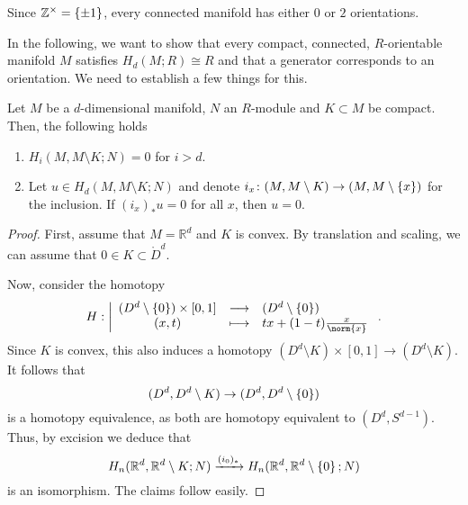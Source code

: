 \begin{example}
  Since $\mathbb{Z}^{\times} = \left\{  \pm 1  \right\} $,
  every connected manifold has either $0$ or  $2$ orientations.
\end{example}

In the following,
we want to show that every compact, connected,
$R$-orientable manifold $M$ satisfies
$H_d(M;R) \cong R$ and that a generator corresponds
to an orientation.
We need to establish a few things for this.

\begin{lemma}
  \label{lm:top-homology-of-manifold-relative-to-cocompact-subset}
  Let $M$ be a $d$-dimensional manifold, $N$ an  $R$-module
  and  $K\subset M$ be compact.
  Then, the following holds
  \begin{enumerate}[h]
    \item $H_i(M, M\setminus K ; N) = 0$ for $i>d$.
    \item Let $u\in H_d(M, M \setminus K;N)$ and denote
      $i_x\colon (M, M \setminus K) \to  (M, M \setminus \left\{  x  \right\} )$
      for the inclusion.
      If $(i_x)_* u = 0$ for all  $x$, then $u=0$.
  \end{enumerate}
\end{lemma}

\begin{proof}
  First, assume that $M = \mathbb{R}^d$ and $K$ is convex.
  By translation and scaling, we can assume that
  $0\in K\subset \mathring{D}^d$.

  Now, consider the homotopy
    \begin{equation*}
    H: \left| \begin{array}{c c l} 
      (D^d \setminus \set{ 0 } ) \times [0,1]
      & \longrightarrow &
      (D^d \setminus \set{ 0 } ) \\
      (x,t) & \longmapsto &  tx + (1-t) \frac{x}{\norm{x}}
    \end{array} \right.
    .
  \end{equation*}
  Since $K$ is convex, this also induces a homotopy
  $(D^d \setminus K) \times [0,1] \to  (D^d \setminus K)$.
  It follows that
  \[
    (D^d, D^d \setminus K) \to (D^d, D^d \setminus \left\{  0  \right\} )
  \]
  is a homotopy equivalence,
  as both are homotopy equivalent to $(D^d, S^{d-1})$.
  Thus, by excision we deduce that
  \[
    H_n(\mathbb{R}^d, \mathbb{R}^d \setminus K;N)
    \xrightarrow{(i_0)_*} 
    H_n(\mathbb{R}^d, \mathbb{R}^d \setminus \left\{  0  \right\} ;N)
  \]
  is an isomorphism.
  The claims follow easily.
\end{proof}
